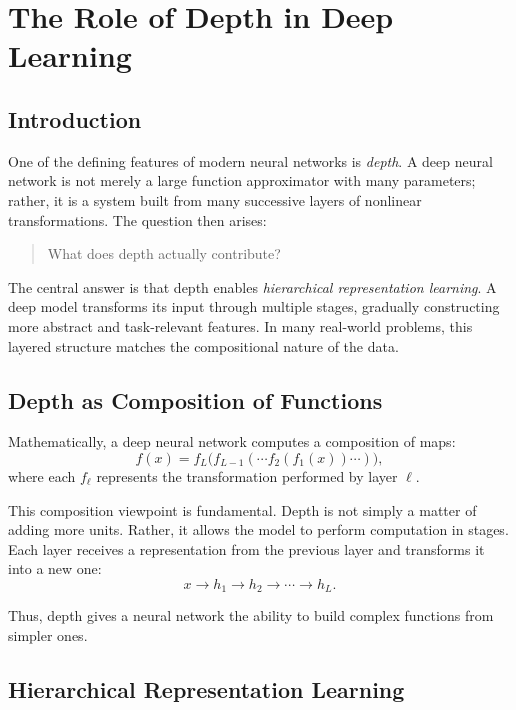 \section{The Role of Depth in Deep Learning}
\label{sec:role-of-depth}

\subsection{Introduction}

One of the defining features of modern neural networks is \emph{depth}. A deep neural network is not merely a large function approximator with many parameters; rather, it is a system built from many successive layers of nonlinear transformations. The question then arises:

\begin{quote}
What does depth actually contribute?
\end{quote}

The central answer is that depth enables \emph{hierarchical representation learning}. A deep model transforms its input through multiple stages, gradually constructing more abstract and task-relevant features. In many real-world problems, this layered structure matches the compositional nature of the data.

\subsection{Depth as Composition of Functions}

Mathematically, a deep neural network computes a composition of maps:
\[
f(x)=f_L\big(f_{L-1}(\cdots f_2(f_1(x))\cdots)\big),
\]
where each \(f_\ell\) represents the transformation performed by layer \(\ell\).

This composition viewpoint is fundamental. Depth is not simply a matter of adding more units. Rather, it allows the model to perform computation in stages. Each layer receives a representation from the previous layer and transforms it into a new one:
\[
x \longrightarrow h_1 \longrightarrow h_2 \longrightarrow \cdots \longrightarrow h_L.
\]

Thus, depth gives a neural network the ability to build complex functions from simpler ones.

\subsection{Hierarchical Representation Learning}

